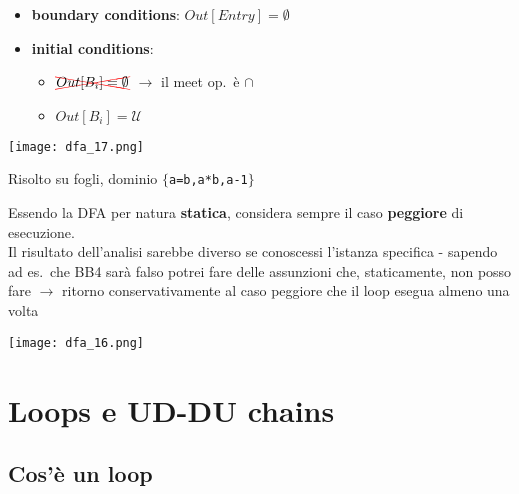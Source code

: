 \noindent\begin{minipage}[c]{.5\textwidth}
  \begin{itemize}
    \item \textbf{boundary conditions}: $Out[Entry] = \emptyset$
    \item \textbf{initial conditions}:
      \begin{itemize}
        \item $\textcolor{red}{\xcancel{\textcolor{black}{Out[B_{i}] = \emptyset}}}$ $\rightarrow$ il meet op.~\`e $\cap$
        \item $Out[B_{i}] = \mathcal{U}$
      \end{itemize}
  \end{itemize}
\end{minipage}\hfill
\begin{minipage}[c]{.4\textwidth}
  \texttt{[image: dfa\_17.png]}
\end{minipage}

\begin{example}
  \noindent\begin{minipage}[c]{.65\textwidth}
    Risolto su fogli, dominio $\lbrace$\lstinline|a=b,a*b,a-1|$\rbrace$
    \begin{emphasize}
      Essendo la DFA per natura \textbf{statica}, considera sempre il caso \textbf{peggiore} di esecuzione.\\
      Il risultato dell'analisi sarebbe diverso se conoscessi l'istanza specifica - sapendo ad es.~che BB4 sar\`a falso potrei fare delle assunzioni che, staticamente, non posso fare $\rightarrow$ ritorno conservativamente al caso peggiore che il loop esegua almeno una volta
    \end{emphasize}
  \end{minipage}\hfill
  \begin{minipage}[c]{.3\textwidth}
    \texttt{[image: dfa\_16.png]}
  \end{minipage}
\end{example}

\section{Loops e UD-DU chains}

\subsection{Cos'\`e un loop}

